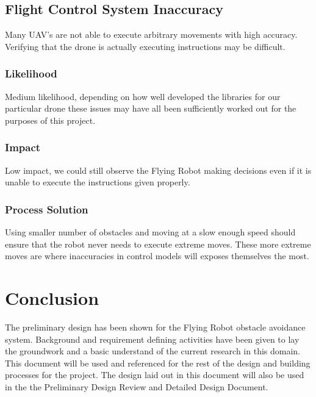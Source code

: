 \documentclass{article}
\begin{document}
	\subsection{Flight Control System Inaccuracy}
	
	Many UAV's are not able to execute arbitrary movements with high accuracy. Verifying that the drone is actually executing instructions may be difficult. 
	
		\subsubsection{Likelihood}
		
		Medium likelihood, depending on how well developed the libraries for our particular drone these issues may have all been sufficiently worked out for the purposes of this project.
		
		\subsubsection{Impact}
		
		Low impact, we could still observe the Flying Robot making decisions even if it is unable to execute the instructions given properly.
		
		\subsubsection{Process Solution}
		
		Using smaller number of obstacles and moving at a slow enough speed should ensure that the robot never needs to execute extreme moves. These more extreme moves are where inaccuracies in control models will exposes themselves the most. 


\section{Conclusion}
The preliminary design has been shown for the Flying Robot obstacle avoidance system. Background and requirement defining activities have been given to lay the groundwork and a basic understand of the current research in this domain. This document will be used and referenced for the rest of the design and building processes for the project. The design laid out in this document will also be used in the the Preliminary Design Review and Detailed Design Document. 


\printbibliography

\end{document}
